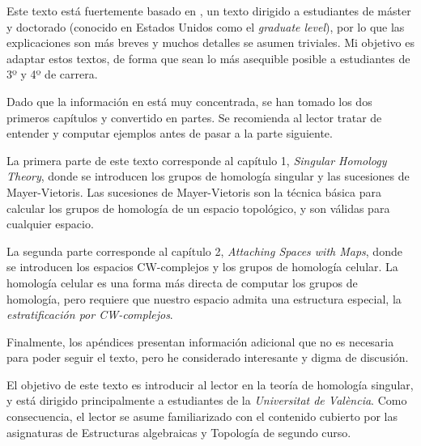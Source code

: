 Este texto está fuertemente basado en \cite{Vick94}, un texto dirigido a estudiantes de máster y doctorado (conocido en Estados Unidos como el \emph{graduate level}), por lo que las explicaciones son más breves y muchos detalles se asumen triviales.
Mi objetivo es adaptar estos textos, de forma que sean lo más asequible posible a estudiantes de 3º y 4º de carrera.

Dado que la información en \cite{Vick94} está muy concentrada, se han tomado los dos primeros capítulos y convertido en partes.
Se recomienda al lector tratar de entender y computar ejemplos antes de pasar a la parte siguiente.

La primera parte de este texto corresponde al capítulo 1, \emph{Singular Homology Theory}, donde se introducen los grupos de homología singular y las sucesiones de Mayer-Vietoris.
Las sucesiones de Mayer-Vietoris son la técnica básica para calcular los grupos de homología de un espacio topológico, y son válidas para cualquier espacio.

La segunda parte corresponde al capítulo 2, \emph{Attaching Spaces with Maps}, donde se introducen los espacios CW-complejos y los grupos de homología celular.
La homología celular es una forma más directa de computar los grupos de homología, pero requiere que nuestro espacio admita una estructura especial, la \emph{estratificación por CW-complejos}.

Finalmente, los apéndices presentan información adicional que no es necesaria para poder seguir el texto, pero he considerado interesante y digma de discusión.

El objetivo de este texto es introducir al lector en la teoría de homología singular, y está dirigido principalmente a estudiantes de la \emph{Universitat de València}.
Como consecuencia, el lector se asume familiarizado con el contenido cubierto por las asignaturas de Estructuras algebraicas y Topología de segundo curso.
